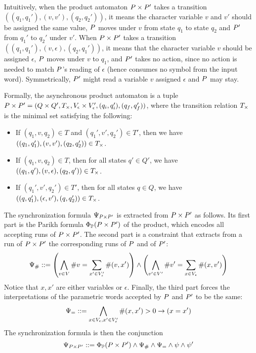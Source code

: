 \documentclass[sigplan,screen]{acmart}
\begin{document}
Intuitively, when the product automaton $P \times P'$ takes a transition $((q_1,q_1'), (v,v'),(q_2,q_2'))$, 
it means the character variable $v$ and $v'$ should be assigned the same value,
$P$ moves under $v$ from state $q_1$ to state $q_2$ and ${P'}$ from $q_1'$ to $q_2'$ under $v'$.
%
When $P \times P'$ takes a transition $((q_1,q_1'), (v,\epsilon),(q_2,q_1'))$, 
it means that the character variable $v$ should be assigned $\epsilon$, 
$P$ moves under $v$ to $q_1$, and ${P'}$ takes no action, since no action is needed to match $P$'s reading of $\epsilon$ (hence consumes no symbol from the input word). Symmetrically, ${P'}$ might read a variable $v$ assigned $\epsilon$ and $P$ may stay.

Formally, the asynchronous product automaton is a tuple $P \times P' = (Q\times Q', T_\times, V_\epsilon \times V'_\epsilon, (q_i,q_i'),(q_f,q_f'))$, where the transition relation $T_\times$ is the minimal set satisfying the following:
%
\begin{itemize}
\item If $(q_1,v,q_2) \in T$ and $(q_1',v',q_2') \in T'$, then we have $((q_1,q_1'),(v,v'),(q_2,q_2'))\in T_\times$.


\item If $(q_1,v,q_2) \in T$, then for all states $q'\in Q'$, we have $((q_1,q'),(v,\epsilon),(q_2,q'))\in T_\times$.



\item If $(q_1',v',q_2') \in T'$, then for all states $q\in Q$, we have $((q,q_1'),(\epsilon,v'),(q,q_2'))\in T_\times$.
\end{itemize}	
%
The synchronization formula $\Psi_{P \times P'}$ is extracted from $P \times P'$ as follows.
Its first part is the Parikh formula $\Phi_{\mathbb{P}}(P \times P')$ of the product, which encodes all accepting runs of $P \times P'$.
%
The second part is a constraint that extracts from a run of $P \times P'$ the corresponding runs of $P$ and of $P'$:
$$ \Psi_{\#} ::= 
\left(\bigwedge_{v\in V}\#v = \sum_{x' \in V'_\epsilon} \#{(v,x')}\right)
\land
\left(\bigwedge_{v'\in V'} \#v' = \sum_{x \in V_\epsilon} \#{(x,v')}\right)
$$
Notice that $x,x'$ are either variables or $\epsilon$.
Finally, the third part forces the interpretations of the parametric words accepted by $P$ and $P'$ to be the same:
$$ \Psi_= ::=
\bigwedge_{x\in V_\epsilon,x'\in V'_\epsilon} \#(x,x')>0 \rightarrow (x=x')
$$
The synchronization formula is then the conjunction 
$$
\Psi_{P \times P'} ::= \Phi_{\mathbb{P}}(P \times P') \land \Psi_{\#} \land \Psi_= \land \psi \land \psi'
$$
\end{document}
